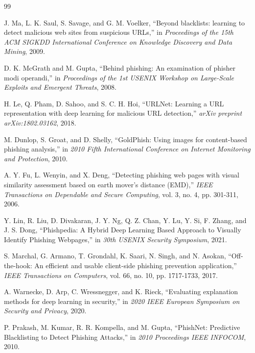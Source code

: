 \documentclass[12pt,a4paper]{report}
\begin{document}
\begin{thebibliography}{99}

J. Ma, L. K. Saul, S. Savage, and G. M. Voelker, ``Beyond blacklists: learning to detect malicious web sites from suspicious URLs,'' in \textit{Proceedings of the 15th ACM SIGKDD International Conference on Knowledge Discovery and Data Mining}, 2009.

D. K. McGrath and M. Gupta, ``Behind phishing: An examination of phisher modi operandi,'' in \textit{Proceedings of the 1st USENIX Workshop on Large-Scale Exploits and Emergent Threats}, 2008.

H. Le, Q. Pham, D. Sahoo, and S. C. H. Hoi, ``URLNet: Learning a URL representation with deep learning for malicious URL detection,'' \textit{arXiv preprint arXiv:1802.03162}, 2018.

M. Dunlop, S. Groat, and D. Shelly, ``GoldPhish: Using images for content-based phishing analysis,'' in \textit{2010 Fifth International Conference on Internet Monitoring and Protection}, 2010.

A. Y. Fu, L. Wenyin, and X. Deng, ``Detecting phishing web pages with visual similarity assessment based on earth mover's distance (EMD),'' \textit{IEEE Transactions on Dependable and Secure Computing}, vol. 3, no. 4, pp. 301-311, 2006.

Y. Lin, R. Liu, D. Divakaran, J. Y. Ng, Q. Z. Chan, Y. Lu, Y. Si, F. Zhang, and J. S. Dong, ``Phishpedia: A Hybrid Deep Learning Based Approach to Visually Identify Phishing Webpages,'' in \textit{30th USENIX Security Symposium}, 2021.

S. Marchal, G. Armano, T. Grondahl, K. Saari, N. Singh, and N. Asokan, ``Off-the-hook: An efficient and usable client-side phishing prevention application,'' \textit{IEEE Transactions on Computers}, vol. 66, no. 10, pp. 1717-1733, 2017.

A. Warnecke, D. Arp, C. Wressnegger, and K. Rieck, ``Evaluating explanation methods for deep learning in security,'' in \textit{2020 IEEE European Symposium on Security and Privacy}, 2020.

P. Prakash, M. Kumar, R. R. Kompella, and M. Gupta, ``PhishNet: Predictive Blacklisting to Detect Phishing Attacks,'' in \textit{2010 Proceedings IEEE INFOCOM}, 2010.


\end{thebibliography}
\end{document}
